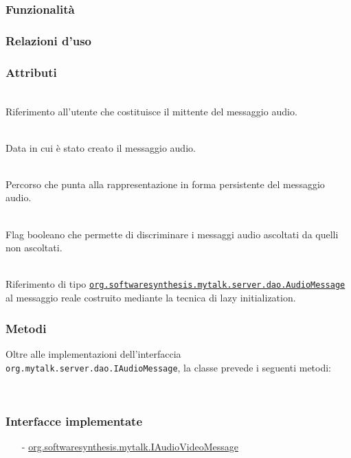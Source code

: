 \subsubsection*{Funzionalità}

\subsubsection*{Relazioni d'uso}

\subsubsection*{Attributi}
\begin{description}
  \item{}\\
Riferimento all'utente che costituisce il mittente del messaggio audio.
  \item{}\\
Data in cui è stato creato il messaggio audio.
  \item{}\\
Percorso che punta alla rappresentazione in forma persistente del messaggio audio.
  \item{}\\
Flag booleano che permette di discriminare i messaggi audio ascoltati da quelli non ascoltati.
  \item{}\\
Riferimento di tipo \hyperref[AudioMessage]{\texttt{org.softwaresynthesis.mytalk.server.dao.AudioMessage}} al messaggio reale  costruito mediante la tecnica di lazy initialization.
\end{description}

\subsubsection*{Metodi}
Oltre alle implementazioni dell'interfaccia \texttt{org.mytalk.server.dao.IAudioMessage}, la classe prevede i seguenti metodi:
\begin{description}
\item{}\\
\end{description}


\subsubsection*{Interfacce implementate}
\begin{itemize}[noitemsep,nolistsep]
  \item[-] \hyperref[IAudioVideoMessage]{\ttfamily{}org.softwaresynthesis.mytalk.IAudioVideoMessage}
\end{itemize}

